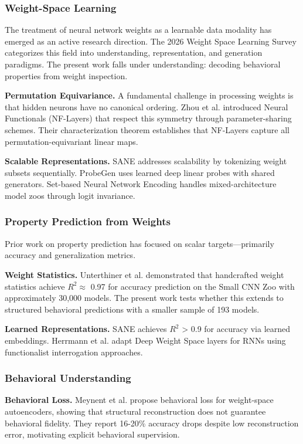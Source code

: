 
\subsubsection{Weight-Space Learning}

The treatment of neural network weights as a learnable data modality has emerged as an active research direction. The 2026 Weight Space Learning Survey categorizes this field into understanding, representation, and generation paradigms. The present work falls under understanding: decoding behavioral properties from weight inspection.

\textbf{Permutation Equivariance.} A fundamental challenge in processing weights is that hidden neurons have no canonical ordering. Zhou et al. introduced Neural Functionals (NF-Layers) that respect this symmetry through parameter-sharing schemes. Their characterization theorem establishes that NF-Layers capture all permutation-equivariant linear maps.

\textbf{Scalable Representations.} SANE addresses scalability by tokenizing weight subsets sequentially. ProbeGen uses learned deep linear probes with shared generators. Set-based Neural Network Encoding handles mixed-architecture model zoos through logit invariance.

\subsubsection{Property Prediction from Weights}

Prior work on property prediction has focused on scalar targets---primarily accuracy and generalization metrics.

\textbf{Weight Statistics.} Unterthiner et al. demonstrated that handcrafted weight statistics achieve $R^2 \approx$ 0.97 for accuracy prediction on the Small CNN Zoo with approximately 30,000 models. The present work tests whether this extends to structured behavioral predictions with a smaller sample of 193 models.

\textbf{Learned Representations.} SANE achieves $R^2$ > 0.9 for accuracy via learned embeddings. Herrmann et al. adapt Deep Weight Space layers for RNNs using functionalist interrogation approaches.

\subsubsection{Behavioral Understanding}

\textbf{Behavioral Loss.} Meynent et al. propose behavioral loss for weight-space autoencoders, showing that structural reconstruction does not guarantee behavioral fidelity. They report 16-20\% accuracy drops despite low reconstruction error, motivating explicit behavioral supervision.
